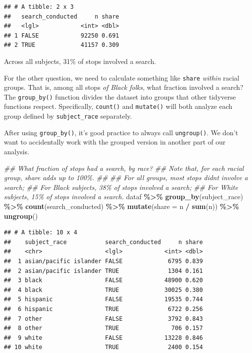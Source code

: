\documentclass[
]{article}
\newenvironment{Shaded}{\begin{snugshade}}{\end{snugshade}}
\newcommand{\CommentTok}[1]{\textcolor[rgb]{0.56,0.35,0.01}{\textit{#1}}}
\newcommand{\DataTypeTok}[1]{\textcolor[rgb]{0.13,0.29,0.53}{#1}}
\newcommand{\KeywordTok}[1]{\textcolor[rgb]{0.13,0.29,0.53}{\textbf{#1}}}
\newcommand{\NormalTok}[1]{#1}
\newcommand{\OperatorTok}[1]{\textcolor[rgb]{0.81,0.36,0.00}{\textbf{#1}}}
\newcommand{\StringTok}[1]{\textcolor[rgb]{0.31,0.60,0.02}{#1}}
\begin{document}
\begin{verbatim}
## # A tibble: 2 x 3
##   search_conducted     n share
##   <lgl>            <int> <dbl>
## 1 FALSE            92250 0.691
## 2 TRUE             41157 0.309
\end{verbatim}

Across all subjects, 31\% of stops involved a search.

For the other question, we need to calculate something like \texttt{share} \emph{within} racial groups. That is, among all stops \emph{of Black folks}, what fraction involved a search? The \texttt{group\_by()} function divides the dataset into groups that other tidyverse functions respect. Specifically, \texttt{count()} and \texttt{mutate()} will both analyze each group defined by \texttt{subject\_race} separately.

After using \texttt{group\_by()}, it's good practice to always call \texttt{ungroup()}. We don't want to accidentally work with the grouped version in another part of our analysis.

\begin{Shaded}
\begin{Highlighting}[]
\CommentTok{\#\# What fraction of stops had a search, by race? }
\CommentTok{\#\# Note that, for each racial group, \textasciigrave{}share\textasciigrave{} adds up to 100\%. }
\CommentTok{\#\# }
\CommentTok{\#\# For all groups, most stops didn\textquotesingle{}t involve a search; }
\CommentTok{\#\# For Black subjects, 38\% of stops involved a search; }
\CommentTok{\#\# For White subjects, 15\% of stops involved a search. }
\NormalTok{dataf }\OperatorTok{\%\textgreater{}\%}\StringTok{ }
\StringTok{    }\KeywordTok{group\_by}\NormalTok{(subject\_race) }\OperatorTok{\%\textgreater{}\%}\StringTok{ }
\StringTok{    }\KeywordTok{count}\NormalTok{(search\_conducted) }\OperatorTok{\%\textgreater{}\%}\StringTok{ }
\StringTok{    }\KeywordTok{mutate}\NormalTok{(}\DataTypeTok{share =}\NormalTok{ n }\OperatorTok{/}\StringTok{ }\KeywordTok{sum}\NormalTok{(n)) }\OperatorTok{\%\textgreater{}\%}\StringTok{ }
\StringTok{    }\KeywordTok{ungroup}\NormalTok{()}
\end{Highlighting}
\end{Shaded}

\begin{verbatim}
## # A tibble: 10 x 4
##    subject_race           search_conducted     n share
##    <chr>                  <lgl>            <int> <dbl>
##  1 asian/pacific islander FALSE             6795 0.839
##  2 asian/pacific islander TRUE              1304 0.161
##  3 black                  FALSE            48900 0.620
##  4 black                  TRUE             30025 0.380
##  5 hispanic               FALSE            19535 0.744
##  6 hispanic               TRUE              6722 0.256
##  7 other                  FALSE             3792 0.843
##  8 other                  TRUE               706 0.157
##  9 white                  FALSE            13228 0.846
## 10 white                  TRUE              2400 0.154
\end{verbatim}
\end{document}
